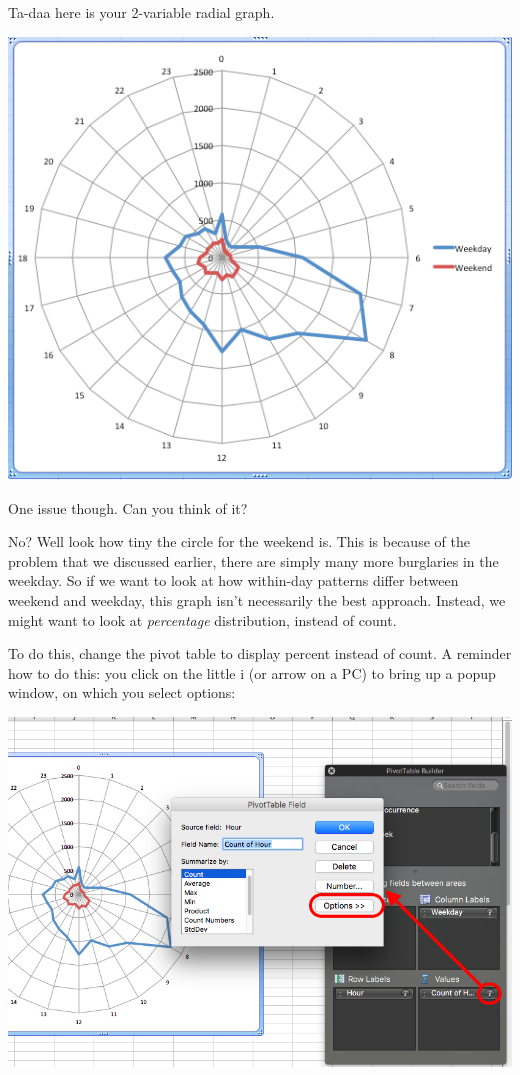 \documentclass[
]{book}
\begin{document}
Ta-daa here is your 2-variable radial graph.

\includegraphics{imgs/hr_r_25.png}

One issue though. Can you think of it?

No? Well look how tiny the circle for the weekend is. This is because of the problem that we discussed earlier, there are simply many more burglaries in the weekday. So if we want to look at how within-day patterns differ between weekend and weekday, this graph isn't necessarily the best approach. Instead, we might want to look at \emph{percentage} distribution, instead of count.

To do this, change the pivot table to display percent instead of count. A reminder how to do this: you click on the little i (or arrow on a PC) to bring up a popup window, on which you select options:

\includegraphics{imgs/hr_r_26.png}
\end{document}
